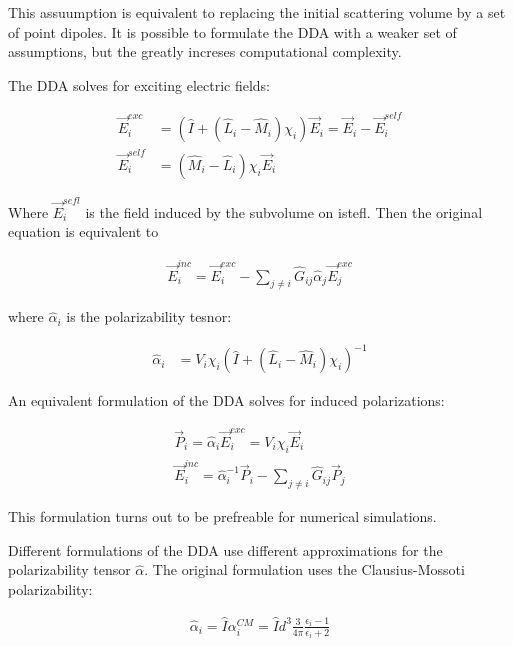             This assuumption is equivalent to replacing the initial scattering volume by a set of point dipoles. It is possible
            to formulate the DDA with a weaker set of assumptions, but the greatly increses computational complexity.

            The DDA solves for exciting electric fields:

            \begin{align}
                \vec{E}_i^{exc} &= \left(\hat{I} + \left(\hat{L}_i - \hat{M}_i \right)\chi_i\right)\vec{E}_i = \vec{E}_i - \vec{E}_i^{self} \\
                \vec{E}_i^{self}&= \left(\hat{M}_i - \hat{L}_i \right)\chi_i\vec{E}_i
            \end{align}

            Where $\vec{E}_i^{sefl}$ is the field induced by the subvolume on istefl. Then the original equation is equivalent to

            \begin{align}
                \vec{E}_i^{inc} = \vec{E}_i^{exc} - \sum_{j\neq i}\hat{G}_{ij}\hat{\alpha}_j\vec{E}_j^{exc}
            \end{align}

            where $\hat{\alpha}_i$ is the polarizability tesnor:

            \begin{align}
                \hat{\alpha}_i &= V_i\chi_i\left(\hat{I} + \left(\hat{L}_i - \hat{M}_i\right)\chi_i\right)^{-1}
            \end{align}

            An equivalent formulation of the DDA solves for induced polarizations:

            \begin{align}
                \vec{P}_i = \hat{\alpha}_i\vec{E}_i^{exc} = V_i\chi_i\vec{E}_i \\
                \vec{E}_i^{inc} = \hat{\alpha}_i^{-1}\vec{P}_i - \sum_{j \neq i} \hat{G}_{ij}\vec{P}_j
            \end{align}

            This formulation turns out to be prefreable for numerical simulations.

            Different formulations of the DDA use different approximations for the polarizability tensor $\hat{\alpha}$. The original
            formulation uses the Clausius-Mossoti polarizability:

            \begin{align}
                \hat{\alpha}_i = \hat{I}\alpha_i^{CM} = \hat{I}d^3\frac{3}{4\pi}\frac{\epsilon_i -1}{\epsilon_i + 2}
            \end{align}

